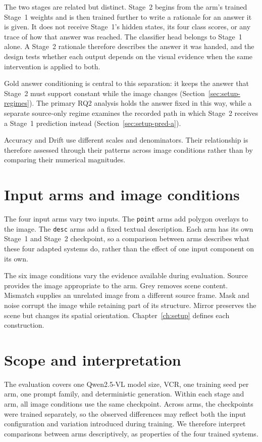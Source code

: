 The two stages are related but distinct. Stage~2 begins from the arm's trained
Stage~1 weights and is then trained further to write a rationale for an answer
it is given. It does not receive Stage~1's hidden states, its four class scores,
or any trace of how that answer was reached. The classifier head belongs to
Stage~1 alone. A Stage~2 rationale therefore describes the answer it was handed,
and the design tests whether each output depends on the visual evidence when the
same intervention is applied to both.

Gold answer conditioning is central to this separation: it keeps the answer
that Stage~2 must support constant while the image changes
(Section~\ref{sec:setup-regimes}). The primary RQ2 analysis holds the answer
fixed in this way, while a separate source-only regime examines the recorded
path in which Stage~2 receives a Stage~1 prediction instead
(Section~\ref{sec:setup-pred-a}).

Accuracy and Drift use different scales and denominators. Their relationship is
therefore assessed through their patterns across image conditions rather than by
comparing their numerical magnitudes.

\section{Input arms and image conditions}
\label{sec:problem-design}

The four input arms vary two inputs. The \texttt{point} arms add polygon
overlays to the image. The \texttt{desc} arms add a fixed textual description.
Each arm has its own Stage~1 and Stage~2 checkpoint, so a comparison between
arms describes what these four adapted systems do, rather than the effect of
one input component on its own.

The six image conditions vary the evidence available during evaluation. Source
provides the image appropriate to the arm. Grey removes scene content. Mismatch
supplies an unrelated image from a different source frame. Mask and noise
corrupt the image while retaining part of its structure. Mirror preserves the
scene but changes its spatial orientation. Chapter~\ref{ch:setup} defines each
construction.

\section{Scope and interpretation}
\label{sec:problem-scope}

The evaluation covers one Qwen2.5-VL model size, VCR, one training seed per
arm, one prompt family, and deterministic generation. Within each stage and
arm, all image conditions use the same checkpoint. Across arms, the checkpoints
were trained separately, so the observed differences may reflect both the input
configuration and variation introduced during training. We therefore interpret
comparisons between arms descriptively, as properties of the four trained
systems.

